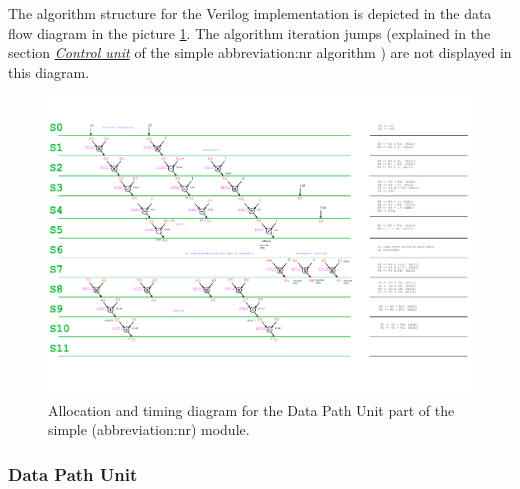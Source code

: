 \documentclass[a4paper, twoside, 11pt]{article}
\newcommand{\fbar}{\FloatBarrier}
\begin{document}
            The algorithm structure for the Verilog implementation is depicted in the data flow diagram in the picture \ref{fig:simple-nr-allocation-timing}. The algorithm iteration jumps (explained in the section \hyperref[subsubsec:simple-nr-control-unit]{\textit{Control unit}} of the simple \gls{abbreviation:nr} algorithm ) are not displayed in this diagram.
            \begin{figure}[htbp!]
                \centering
                \includegraphics[width=1\textwidth]{src/pdf/simple-nr-allocation-timing.pdf}
                \caption{Allocation and timing diagram for the Data Path Unit part of the simple (\gls{abbreviation:nr}) module.}
                \label{fig:simple-nr-allocation-timing}
            \end{figure}

        \fbar
        \subsubsection{Data Path Unit}
\end{document}
